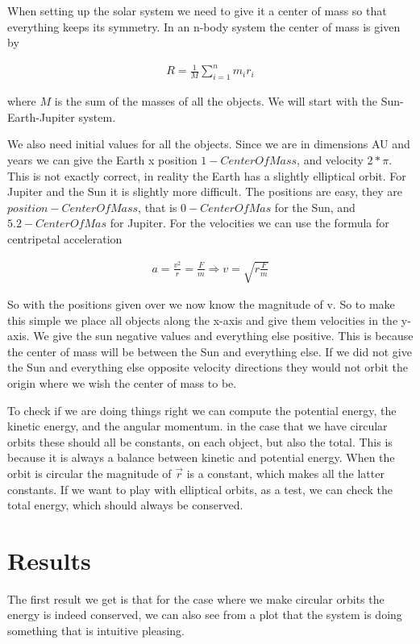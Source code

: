 \documentclass[norsk,a4paper,12pt]{article}
\begin{document}
When setting up the solar system we need to give it a center of mass so that everything keeps its symmetry. In an n-body system
the center of mass is given by

\begin{align}
 R = \frac{1}{M} \sum_{i=1}^{n} m_i r_i
\end{align}

where $M$ is the sum of the masses of all the objects. We will start with the Sun-Earth-Jupiter system.

We also need initial values for all the objects. Since we are in dimensions AU and years we can give the Earth x position $1-CenterOfMass$,
and velocity $2*\pi$. This is not exactly correct, in reality the Earth has a slightly elliptical orbit. For Jupiter and the Sun it 
is slightly more difficult. The positions are easy, they are $position-CenterOfMass$, that is $0-CenterOfMas$ for the Sun, and $5.2-CenterOfMas$
for Jupiter. For the velocities we can use the formula for centripetal acceleration

\begin{align}
 a = \frac{v^2}{r} = \frac{F}{m} \Rightarrow v = \sqrt{r\frac{F}{m}}
\end{align}

So with the positions given over we now know the magnitude of v. So to make this simple we place all objects along the x-axis and give them velocities
in the y-axis. We give the sun negative values and everything else positive. This is because the center of mass will be between 
the Sun and everything else. If we did not give the Sun and everything else opposite velocity directions they would not orbit the 
origin where we wish the center of mass to be.

To check  if we are doing things right we can compute the potential energy, the kinetic energy, and the angular momentum. 
in the case that we have circular orbits these should all be constants, on each object, but also the total. This is because 
it is always a balance between kinetic and potential energy. When the orbit is circular the magnitude of $\vec{r}$ is a constant, which
makes all the latter constants. If we want to play with elliptical orbits, as a test, we can check the total energy, which should 
always be conserved.

\section*{Results}

The first result we get is that for the case where we make circular orbits the energy is indeed conserved, we can also see from a 
plot that the system is doing something that is intuitive pleasing.
\end{document}

